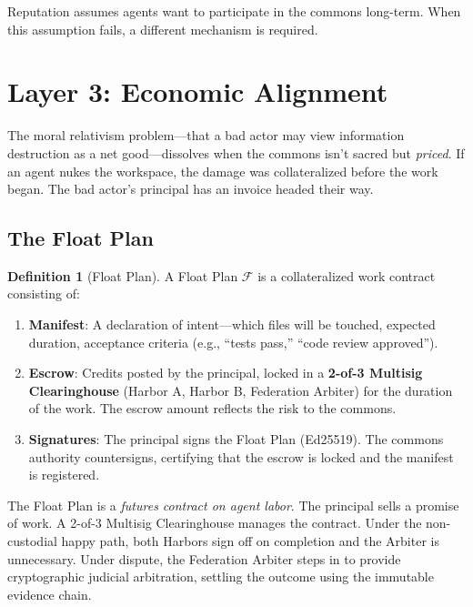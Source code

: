 \documentclass[11pt,a4paper]{article}
\theoremstyle{definition}
\newtheorem{definition}{Definition}[section]
\theoremstyle{remark}
\begin{document}
Reputation assumes agents want to participate in the commons long-term. When this assumption fails, a different mechanism is required.

\section{Layer 3: Economic Alignment}\label{sec:economic}

The moral relativism problem---that a bad actor may view information destruction as a net good---dissolves when the commons isn't sacred but \emph{priced}. If an agent nukes the workspace, the damage was collateralized before the work began. The bad actor's principal has an invoice headed their way.

\subsection{The Float Plan}

\begin{definition}[Float Plan]\label{def:float-plan}
A Float Plan $\mathcal{F}$ is a collateralized work contract consisting of:
\begin{enumerate}[nosep]
  \item \textbf{Manifest}: A declaration of intent---which files will be touched, expected duration, acceptance criteria (e.g., ``tests pass,'' ``code review approved'').
  \item \textbf{Escrow}: Credits posted by the principal, locked in a \textbf{2-of-3 Multisig Clearinghouse} (Harbor A, Harbor B, Federation Arbiter) for the duration of the work. The escrow amount reflects the risk to the commons.
  \item \textbf{Signatures}: The principal signs the Float Plan (Ed25519). The commons authority countersigns, certifying that the escrow is locked and the manifest is registered.
\end{enumerate}
\end{definition}

The Float Plan is a \emph{futures contract on agent labor}. The principal sells a promise of work. A 2-of-3 Multisig Clearinghouse manages the contract. Under the non-custodial happy path, both Harbors sign off on completion and the Arbiter is unnecessary. Under dispute, the Federation Arbiter steps in to provide cryptographic judicial arbitration, settling the outcome using the immutable evidence chain.
\end{document}
